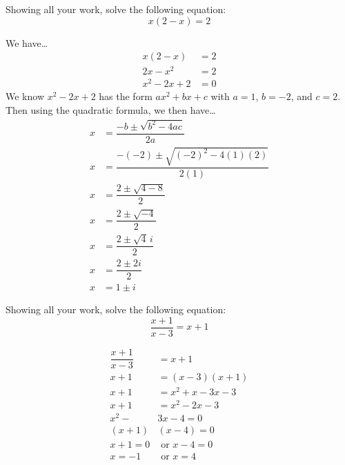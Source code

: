 \documentclass[11pt,letterpaper]{article}
\begin{document}
\newpage



 Showing all your work, solve the following equation:
	\[
	x(2 - x)= 2
	\] \pspace

\sol We have\dots \pspace
	\[
	\begin{aligned}
	x(2 - x)&= 2 \\[0.3cm]
	2x - x^2&= 2 \\[0.3cm]
	x^2 - 2x + 2&= 0 
	\end{aligned}
	\] \pspace
We know $x^2 - 2x + 2$ has the form $ax^2 + bx + c$ with $a= 1$, $b= -2$, and $c= 2$. Then using the quadratic formula, we then have\dots \pspace
	\[
	\begin{aligned}
	x&= \dfrac{-b \pm \sqrt{b^2 - 4ac}}{2a} \\[0.3cm]
	x&= \dfrac{-(-2) \pm \sqrt{(-2)^2 - 4(1)(2)}}{2(1)} \\[0.3cm]
	x&= \dfrac{2 \pm \sqrt{4 - 8}}{2} \\[0.3cm]
	x&= \dfrac{2 \pm \sqrt{-4}}{2} \\[0.3cm]
	x&= \dfrac{2 \pm \sqrt{4}\,i}{2} \\[0.3cm]
	x&= \dfrac{2 \pm 2i}{2} \\[0.3cm]
	x&= 1 \pm i 
	\end{aligned}
	\] 



\newpage


 Showing all your work, solve the following equation:
	\[
	\dfrac{x + 1}{x - 3}= x + 1
	\] \pspace

\sol
	\[
	\begin{aligned}
	\dfrac{x + 1}{x - 3}&= x + 1 \\[0.3cm]
	x + 1&= (x - 3)(x + 1) \\[0.3cm]
	x + 1&= x^2 + x - 3x - 3 \\[0.3cm]
	x + 1&= x^2 - 2x - 3 \\[0.3cm]
	x^2 - &3x - 4= 0 \\[0.3cm]
	(x + 1)&(x - 4)= 0 \\[0.3cm]
	x + 1= 0 &\text{  or  } x - 4= 0 \\[0.3cm]
	x= -1 &\text{  or  } x= 4 
	\end{aligned}
	\]
\end{document}
